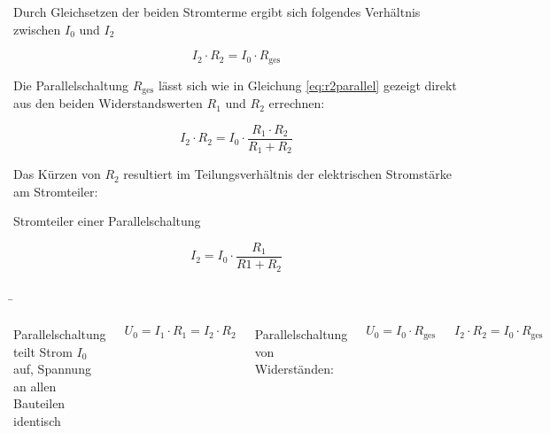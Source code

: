 \begin{frame}
{		Durch Gleichsetzen der beiden Stromterme ergibt sich folgendes Verhältnis zwischen $I_0$ und $I_2$

		\begin{equation*}
			I_2 \cdot R_2 = I_0 \cdot R_\mathrm{ges}
		\end{equation*}

		Die Parallelschaltung $R_\mathrm{ges}$ lässt sich wie in Gleichung \ref{eq:r2parallel} gezeigt direkt aus den beiden Widerstandswerten
		$R_1$ und $R_2$ errechnen:

		\begin{equation*}
			I_2 \cdot R_2 = I_0 \cdot \frac{R_1 \cdot R_2}{R_1 + R_2}
		\end{equation*}

		Das Kürzen von $R_2$ resultiert im Teilungsverhältnis der elektrischen Stromstärke am Stromteiler:

		\begin{Merksatz}{Stromteiler einer Parallelschaltung}

			\begin{equation}
				I_2 = I_0 \cdot \frac{R_1}{R1 + R_2}
			\end{equation}
		\end{Merksatz}


	}


	\b{
		\begin{columns}

			Parallelschaltung teilt Strom $I_0$ auf,
			Spannung an allen Bauteilen identisch

			\begin{equation*}
				U_0 = I_1 \cdot R_1 = I_2 \cdot R_2
			\end{equation*}

			Parallelschaltung von Widerständen:

			\begin{equation*}
				U_0 = I_0 \cdot R_\mathrm{ges}
			\end{equation*}
			\vspace*{-10pt}

			\begin{equation*}
				I_2 \cdot R_2 = I_0 \cdot R_\mathrm{ges}
			\end{equation*}


\end{columns}}
\end{frame}
